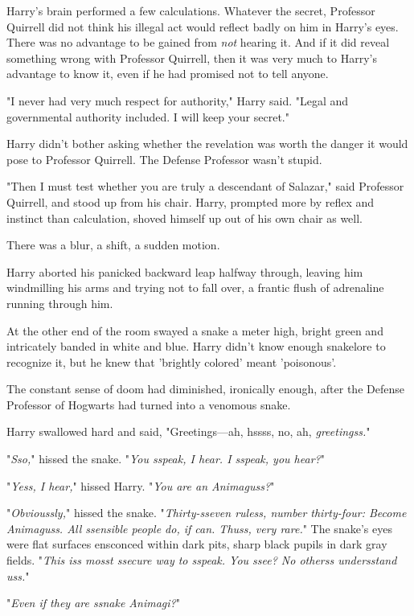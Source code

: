 Harry's brain performed a few calculations. Whatever the secret, Professor Quirrell did not think his illegal act would reflect badly on him in Harry's eyes. There was no advantage to be gained from \emph{not} hearing it. And if it did reveal something wrong with Professor Quirrell, then it was very much to Harry's advantage to know it, even if he had promised not to tell anyone.

"I never had very much respect for authority," Harry said. "Legal and governmental authority included. I will keep your secret."

Harry didn't bother asking whether the revelation was worth the danger it would pose to Professor Quirrell. The Defense Professor wasn't stupid.

"Then I must test whether you are truly a descendant of Salazar," said Professor Quirrell, and stood up from his chair. Harry, prompted more by reflex and instinct than calculation, shoved himself up out of his own chair as well.

There was a blur, a shift, a sudden motion.

Harry aborted his panicked backward leap halfway through, leaving him windmilling his arms and trying not to fall over, a frantic flush of adrenaline running through him.

At the other end of the room swayed a snake a meter high, bright green and intricately banded in white and blue. Harry didn't know enough snakelore to recognize it, but he knew that 'brightly colored' meant 'poisonous'.

The constant sense of doom had diminished, ironically enough, after the Defense Professor of Hogwarts had turned into a venomous snake.

Harry swallowed hard and said, "Greetings---ah, hssss, no, ah, \emph{greetingss.}"

"\emph{Sso,}" hissed the snake. "\emph{You sspeak, I hear. I sspeak, you hear?}"

"\emph{Yess, I hear,}" hissed Harry. "\emph{You are an Animaguss?}"

"\emph{Obvioussly,}" hissed the snake. "\emph{Thirty-sseven ruless, number thirty-four: Become Animaguss. All ssensible people do, if can. Thuss, very rare.}" The snake's eyes were flat surfaces ensconced within dark pits, sharp black pupils in dark gray fields. "\emph{This iss mosst ssecure way to sspeak. You ssee? No otherss undersstand uss.}"

"\emph{Even if they are ssnake Animagi?}"

